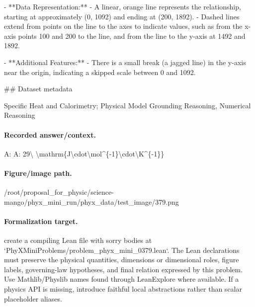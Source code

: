 - **Data Representation:**
  - A linear, orange line represents the relationship, starting at approximately (0, 1092) and ending at (200, 1892). 
  - Dashed lines extend from points on the line to the axes to indicate values, such as from the x-axis points 100 and 200 to the line, and from the line to the y-axis at 1492 and 1892.

- **Additional Features:**
  - There is a small break (a jagged line) in the y-axis near the origin, indicating a skipped scale between 0 and 1092.

\#\# Dataset metadata

Specific Heat and Calorimetry; Physical Model Grounding Reasoning, Numerical Reasoning

\paragraph{Recorded answer/context.}
A: A: 29\textbackslash{} \textbackslash{}mathrm\{J\textbackslash{}cdot\textbackslash{}mol\textasciicircum{}\{-1\}\textbackslash{}cdot\textbackslash{}K\textasciicircum{}\{-1\}\}

\paragraph{Figure/image path.}
/root/proposal\_for\_physic/science-mango/phyx\_mini\_run/phyx\_data/test\_image/379.png

\paragraph{Formalization target.}
create a compiling Lean file with sorry bodies at `PhyXMiniProblems/problem\_phyx\_mini\_0379.lean`. The Lean declarations must preserve the physical quantities, dimensions or dimensional roles, figure labels, governing-law hypotheses, and final relation expressed by this problem.
Use Mathlib/Physlib names found through LeanExplore where available. If a physics API is missing, introduce faithful local abstractions rather than scalar placeholder aliases.

